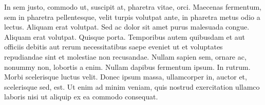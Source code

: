 In sem justo, commodo ut, suscipit at, pharetra vitae, orci. Maecenas fermentum, sem in pharetra pellentesque, velit turpis volutpat ante, in pharetra metus odio a lectus. Aliquam erat volutpat. Sed ac dolor sit amet purus malesuada congue. Aliquam erat volutpat. Quisque porta. Temporibus autem quibusdam et aut officiis debitis aut rerum necessitatibus saepe eveniet ut et voluptates repudiandae sint et molestiae non recusandae. Nullam sapien sem, ornare ac, nonummy non, lobortis a enim. Nullam dapibus fermentum ipsum. In rutrum. Morbi scelerisque luctus velit. Donec ipsum massa, ullamcorper in, auctor et, scelerisque sed, est. Ut enim ad minim veniam, quis nostrud exercitation ullamco laboris nisi ut aliquip ex ea commodo consequat.
\endinput
